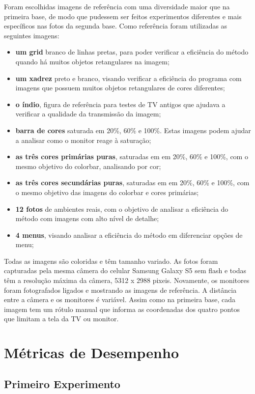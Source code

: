 Foram escolhidas imagens de referência com uma diversidade maior que na primeira base, de modo que pudessem ser feitos experimentos diferentes e mais específicos nas fotos da segunda base. Como referência foram utilizadas as seguintes imagens:
\begin{itemize}
\item \textbf{um grid} branco de linhas pretas, para poder verificar a eficiência do método quando há muitos objetos retangulares na imagem;
\item \textbf{um xadrez} preto e branco, visando verificar a eficiência do programa com imagens que possuem muitos objetos retangulares de cores diferentes;
\item \textbf{o índio}, figura de referência para testes de TV antigos que ajudava a verificar a qualidade da transmissão da imagem;
\item \textbf{barra de cores} saturada em 20\%, 60\% e 100\%. Estas imagens podem ajudar a analisar como o monitor reage à saturação;
\item \textbf{as três cores primárias puras}, saturadas em em 20\%, 60\% e 100\%, com o mesmo objetivo do colorbar, analisando por cor;
\item \textbf{as três cores secundárias puras}, saturadas em em 20\%, 60\% e 100\%, com o mesmo objetivo das imagens do colorbar e cores primárias;
\item \textbf{12 fotos} de ambientes reais, com o objetivo de analisar a eficiência do método com imagens com alto nível de detalhe;
\item \textbf{4 menus}, visando analisar a eficiência do método em diferenciar opções de menu;
\end{itemize}

Todas as imagens são coloridas e têm tamanho variado. As fotos foram capturadas pela mesma câmera do celular Samsung Galaxy S5 sem flash e todas têm a resolução máxima da câmera, 5312 x 2988 pixeis. Novamente, os monitores foram fotografados ligados e mostrando as imagens de referência. A distância entre a câmera e os monitores é variável. Assim como na primeira base, cada imagem tem um rótulo manual que informa as coordenadas dos quatro pontos que limitam a tela da TV ou monitor.


\section{Métricas de Desempenho} \label{exp:metrica}


\subsection{Primeiro Experimento} \label{exp:metrica1}

